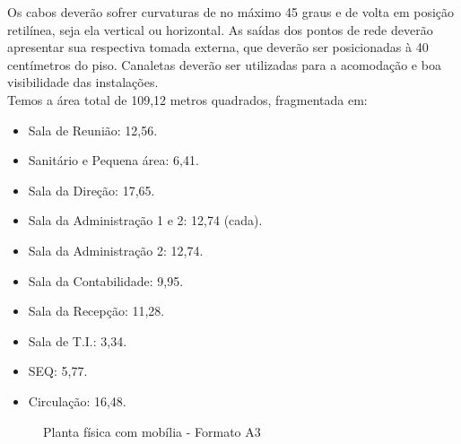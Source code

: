 \documentclass[	DIV=calc,%
							paper=a4,%
							fontsize=12pt,%
							onecolumn]{scrartcl}	 					%
\begin{document}
Os cabos deverão sofrer curvaturas de no máximo 45 graus e de volta em posição retilínea, seja ela vertical ou horizontal. As saídas dos pontos de rede deverão apresentar sua respectiva tomada externa, que deverão ser posicionadas à 40 centímetros do piso. Canaletas deverão ser utilizadas para a acomodação e boa visibilidade das instalações.
\\

Temos a área total de 109,12 metros quadrados, fragmentada em:

\begin{itemize}
	\item Sala de Reunião: 12,56.
	\item Sanitário e Pequena área: 6,41.
	\item Sala da Direção: 17,65.
	\item Sala da Administração 1 e 2: 12,74 (cada).
	\item Sala da Administração 2: 12,74.
	\item Sala da Contabilidade: 9,95.
	\item Sala da Recepção: 11,28.
	\item Sala de T.I.: 3,34.
	\item SEQ: 5,77.
	\item Circulação: 16,48.
	
	
\end{itemize}


\clearpage
{}
\recalctypearea


\begin{figure}
	\noindent{}
	\caption{Planta física com mobília - Formato A3}
	\label{fig1}
\end{figure}
\end{document}
